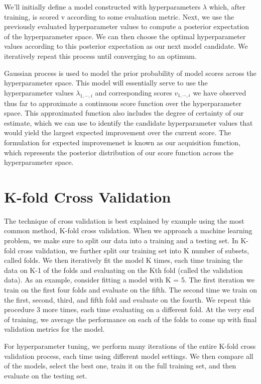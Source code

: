 \documentclass{book}
\begin{document}
\begin{itemize}
We'll initially define a model constructed with hyperparameters $\lambda$
which, after training, is scored v according to some evaluation metric. Next, we use the previously evaluated hyperparameter values to compute a posterior expectation of the hyperparameter space. We can then choose the optimal hyperparameter values according to this posterior expectation as our next model candidate. We iteratively repeat this process until converging to an optimum.

Gaussian process is used to model the prior probability of model scores across the hyperparameter space. This model will essentially serve to use the hyperparameter values $\lambda_{1,\cdots,i}$ and corresponding scores $v_{1,\cdots,i}$ we have observed thus far to approximate a continuous score function over the hyperparameter space. This approximated function also includes the degree of certainty of our estimate, which we can use to identify the candidate hyperparameter values that would yield the largest expected improvement over the current score. The formulation for expected improvemenet is known as our acquisition function, which represents the posterior distribution of our score function across the hyperparameter space.
\end{itemize}

\section{K-fold Cross Validation}
The technique of cross validation is best explained by example using the most common method, K-fold cross validation. When we approach a machine learning problem, we make sure to split our data into a training and a testing set. In K-fold cross validation, we further split our training set into K number of subsets, called folds. We then iteratively fit the model K times, each time training the data on K-1 of the folds and evaluating on the Kth fold (called the validation data). As an example, consider fitting a model with K = 5. The first iteration we train on the first four folds and evaluate on the fifth. The second time we train on the first, second, third, and fifth fold and evaluate on the fourth. We repeat this procedure 3 more times, each time evaluating on a different fold. At the very end of training, we average the performance on each of the folds to come up with final validation metrics for the model.

For hyperparameter tuning, we perform many iterations of the entire K-fold cross validation process, each time using different model settings. We then compare all of the models, select the best one, train it on the full training set, and then evaluate on the testing set.
\end{document}
